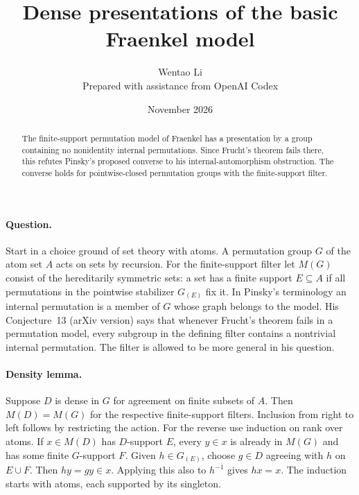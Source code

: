 \documentclass[11pt]{article}
\title{Dense presentations of the basic Fraenkel model}
\author{Wentao Li\\[2pt]\small Prepared with assistance from OpenAI Codex}
\date{November 2026}
\begin{document}
\maketitle
\begin{abstract}
The finite-support permutation model of Fraenkel has a presentation by a group containing no nonidentity internal permutations. Since Frucht's theorem fails there, this refutes Pinsky's proposed converse to his internal-automorphism obstruction. The converse holds for pointwise-closed permutation groups with the finite-support filter.
\end{abstract}

\paragraph{Question.} Start in a choice ground of set theory with atoms. A permutation group $G$ of the atom set $A$ acts on sets by recursion. For the finite-support filter let $M(G)$ consist of the hereditarily symmetric sets: a set has a finite support $E\subseteq A$ if all permutations in the pointwise stabilizer $G_{(E)}$ fix it. In Pinsky's terminology an internal permutation is a member of $G$ whose graph belongs to the model. His Conjecture~13 (arXiv version) says that whenever Frucht's theorem fails in a permutation model, every subgroup in the defining filter contains a nontrivial internal permutation. The filter is allowed to be more general in his question.

\paragraph{Density lemma.} Suppose $D$ is dense in $G$ for agreement on finite subsets of $A$. Then $M(D)=M(G)$ for the respective finite-support filters. Inclusion from right to left follows by restricting the action. For the reverse use induction on rank over atoms. If $x\in M(D)$ has $D$-support $E$, every $y\in x$ is already in $M(G)$ and has some finite $G$-support $F$. Given $h\in G_{(E)}$, choose $g\in D$ agreeing with $h$ on $E\cup F$. Then $hy=gy\in x$. Applying this also to $h^{-1}$ gives $hx=x$. The induction starts with atoms, each supported by its singleton.
\end{document}
